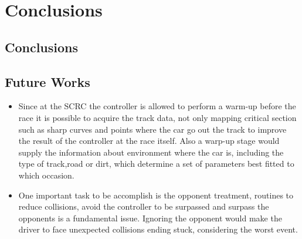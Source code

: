 \section{Conclusions} \label{sec:Conclusions}

	
\subsection{Conclusions} \label{subsec:Conclusions}


\subsection{Future Works} \label{subsec:Future}
	
	
	\begin{itemize}
		
		\item Since at the SCRC the controller is allowed to perform a warm-up before the race it is possible to acquire the track data, not only mapping critical section such as sharp curves and points where the car go out the track to improve the result of the controller at the race itself. Also a warp-up stage would supply the information about environment where the car is, including the type of track,road or dirt, which determine a set of parameters best fitted to which occasion. 
		
		\item One important task to be accomplish is the opponent treatment, routines to reduce collisions, avoid the controller to be surpassed and surpass the opponents is a fundamental issue. Ignoring the opponent would make the driver to face unexpected collisions ending stuck, considering the worst event.
		
	\end{itemize}
	
	
	
	